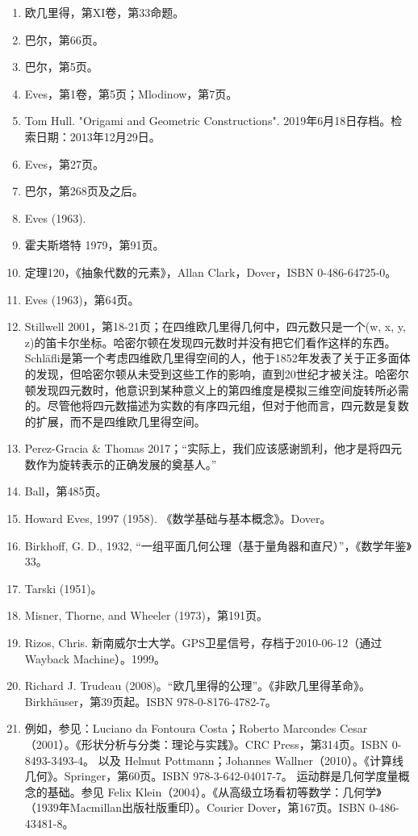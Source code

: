 \begin{enumerate}
\item 欧几里得，第XI卷，第33命题。  
\item 巴尔，第66页。  
\item 巴尔，第5页。  
\item Eves，第1卷，第5页；Mlodinow，第7页。  
\item Tom Hull. "Origami and Geometric Constructions". 2019年6月18日存档。检索日期：2013年12月29日。  
\item Eves，第27页。  
\item 巴尔，第268页及之后。
\item Eves (1963).  
\item 霍夫斯塔特 1979，第91页。  
\item 定理120，《抽象代数的元素》，Allan Clark，Dover，ISBN 0-486-64725-0。  
\item Eves (1963)，第64页。  
\item Stillwell 2001，第18-21页；在四维欧几里得几何中，四元数只是一个(w, x, y, z)的笛卡尔坐标。哈密尔顿在发现四元数时并没有把它们看作这样的东西。Schläfli是第一个考虑四维欧几里得空间的人，他于1852年发表了关于正多面体的发现，但哈密尔顿从未受到这些工作的影响，直到20世纪才被关注。哈密尔顿发现四元数时，他意识到某种意义上的第四维度是模拟三维空间旋转所必需的。尽管他将四元数描述为实数的有序四元组，但对于他而言，四元数是复数的扩展，而不是四维欧几里得空间。
\item Perez-Gracia & Thomas 2017；“实际上，我们应该感谢凯利，他才是将四元数作为旋转表示的正确发展的奠基人。”  
\item Ball，第485页。  
\item Howard Eves, 1997 (1958). 《数学基础与基本概念》。Dover。  
\item Birkhoff, G. D., 1932, “一组平面几何公理（基于量角器和直尺）”，《数学年鉴》33。  
\item Tarski (1951)。  
\item Misner, Thorne, and Wheeler (1973)，第191页。  
\item Rizos, Chris. 新南威尔士大学。GPS卫星信号，存档于2010-06-12（通过Wayback Machine）。1999。  
\item Richard J. Trudeau (2008)。“欧几里得的公理”。《非欧几里得革命》。Birkhäuser，第39页起。ISBN 978-0-8176-4782-7。
\item 例如，参见：Luciano da Fontoura Costa；Roberto Marcondes Cesar（2001）。《形状分析与分类：理论与实践》。CRC Press，第314页。ISBN 0-8493-3493-4。  
以及 Helmut Pottmann；Johannes Wallner（2010）。《计算线几何》。Springer，第60页。ISBN 978-3-642-04017-7。  
运动群是几何学度量概念的基础。参见 Felix Klein（2004）。《从高级立场看初等数学：几何学》（1939年Macmillan出版社版重印）。Courier Dover，第167页。ISBN 0-486-43481-8。  

\end{enumerate}
